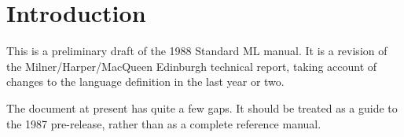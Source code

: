 \chapter{Introduction}

This is a preliminary draft of the 1988 Standard ML manual.  It is a
revision of the Milner/Harper/MacQueen Edinburgh technical report,
taking account of changes to the language definition in the last year
or two.

The document at present has quite a few gaps.  It should be treated
as a guide to the 1987 pre-release, rather than as a complete
reference manual.
